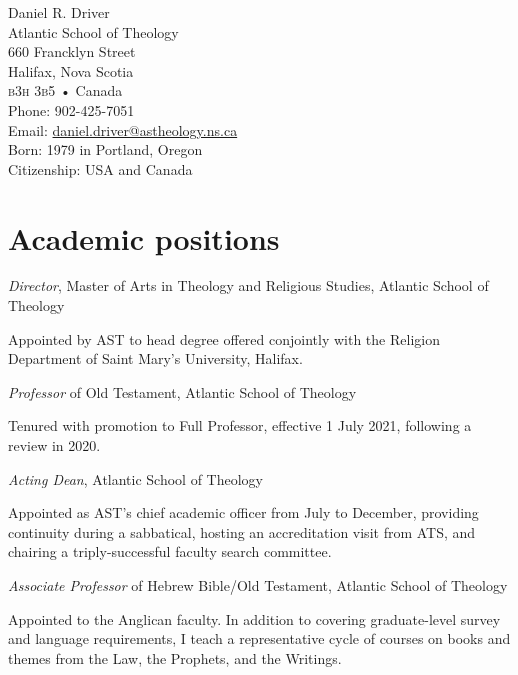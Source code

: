 \documentclass[11pt]{article}
\newcommand{\years}[1]{\marginnote{\footnotesize #1}}
\begin{document}
{\Huge Daniel R. Driver}\\[3em]
%
Atlantic School of Theology\\
660 Francklyn Street\\
Halifax, Nova Scotia\\
\textsc{b3h 3b5} • Canada\\[1em]
%
Phone: 902-425-7051\\
Email: \href{mailto:daniel.driver@astheology.ns.ca}{daniel.driver@astheology.ns.ca}\\[1em]
%
Born: 1979 in Portland, Oregon\\
Citizenship: USA and Canada
\vfill

\section*{Academic positions}
\years{2022---}
\emph{Director}, Master of Arts in Theology and Religious Studies, Atlantic School of Theology
	\begin{quoting}
	Appointed by AST to head degree offered conjointly with the Religion Department of Saint Mary’s University, Halifax.
	\end{quoting}


\years{2021---} \emph{Professor} of Old Testament, Atlantic School of Theology
	\begin{quoting}
	Tenured with promotion to Full Professor, effective 1 July 2021, following a review in 2020.
	\end{quoting}

\years{2020} \emph{Acting Dean}, Atlantic School of Theology
	\begin{quoting}
	Appointed as AST's chief academic officer from July to December, providing continuity during a sabbatical, hosting an accreditation visit from ATS, and chairing a triply-successful faculty search committee.
	\end{quoting}

\years{2016--2021} \emph{Associate Professor} of Hebrew Bible/Old Testament, Atlantic School of Theology
	\begin{quoting}
	Appointed to the Anglican faculty. In addition to covering
	graduate-level survey and language requirements, I teach a
	representative cycle of courses on books and themes from the Law,
	the Prophets, and the Writings.
	\end{quoting}
\end{document}
